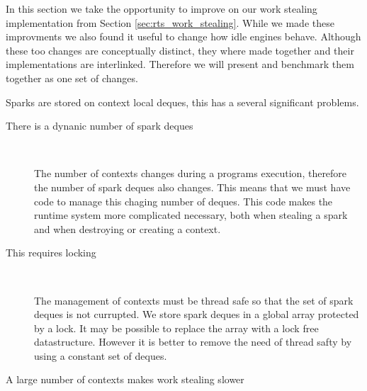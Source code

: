 

In this section we take the opportunity to improve on our work stealing
implementation from Section \ref{sec:rts_work_stealing}.
While we made these improvments we also found it useful to change how idle
engines behave.
Although these too changes are conceptually distinct,
they where made together and their implementations are interlinked.
Therefore we will present and benchmark them together as one set of changes.

Sparks are stored on context local deques,
this has a several significant problems.

\begin{description}

    \item[There is a dynanic number of spark deques]~

    The number of contexts changes during a programs execution,
    therefore the number of spark deques also changes.
    This means that we must have code to manage this chaging number of
    deques.
    This code makes the runtime system more complicated necessary,
    both when stealing a spark and when destroying or creating a context.

    \item[This requires locking]~

    The management of contexts must be thread safe so that the set of
    spark deques is not currupted.
    We store spark deques in a global array protected by a lock.
    It may be possible to replace the array with a lock free datastructure.
    However it is better to remove the need of thread safty by using a
    constant set of deques.

    \item[A large number of contexts makes work stealing slower]~
    

\end{description}
